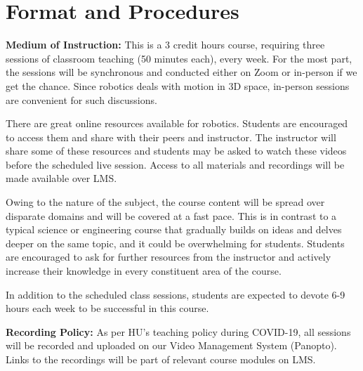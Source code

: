 \documentclass[a4paper,11pt]{article}
\begin{document}
\section{Format and Procedures}
\textbf{Medium of Instruction:} This is a 3 credit hours course, requiring three sessions of classroom teaching (50 minutes each), every week. For the most part, the sessions will be synchronous and conducted either on Zoom or in-person if we get the chance. Since robotics deals with motion in 3D space, in-person sessions are convenient for such discussions. 

There are great online resources available for robotics. Students are encouraged to access them and share with their peers and instructor. The instructor will share some of these resources and students may be asked to watch these videos before the scheduled live session. Access to all materials and recordings will be made available over LMS.

Owing to the nature of the subject, the course content will be spread over disparate domains and will be covered at a fast pace. This is in contrast to a typical science or engineering course that gradually builds on ideas and delves deeper on the same topic, and it could be overwhelming for students. Students are encouraged to ask for further resources from the instructor and actively increase their knowledge in every constituent area of the course. 

In addition to the scheduled class sessions, students are expected to devote 6-9 hours each week to be successful in this course. 

\textbf{Recording Policy:} As per HU's teaching policy during COVID-19, all sessions will be recorded and uploaded on our Video Management System (Panopto). Links to the recordings will be part of relevant course modules on LMS.
\end{document}
